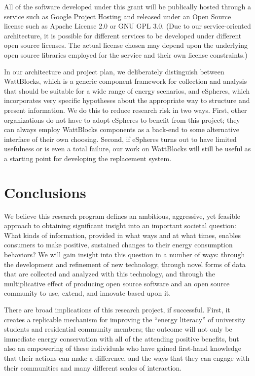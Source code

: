 All of the software developed under this grant will be publically hosted
through a service such as Google Project Hosting and released under an Open
Source license such as Apache License 2.0 or GNU GPL 3.0.  (Due to our
service-oriented architecture, it is possible for different services to be
developed under different open source licenses.  The actual license chosen
may depend upon the underlying open source libraries employed for the
service and their own license constraints.)

In our architecture and project plan, we deliberately distinguish between
WattBlocks, which is a generic component framework for collection and
analysis that should be suitable for a wide range of energy scenarios, and
eSpheres, which incorporates very specific hypotheses about the appropriate
way to structure and present information.  We do this to reduce research
risk in two ways. First, other organizations do not have to adopt eSpheres
to benefit from this project; they can always employ WattBlocks components
as a back-end to some alternative interface of their own choosing.  Second,
if eSpheres turns out to have limited usefulness or is even a total
failure, our work on WattBlocks will still be useful as a starting point
for developing the replacement system.

\section{Conclusions}
\label{sec:merit}

We believe this research program defines an ambitious, aggressive, yet
feasible approach to obtaining significant insight into an important
societal question: What kinds of information, provided in what ways and at
what times, enables consumers to make positive, sustained changes to their
energy consumption behaviors?  We will gain insight into this question in a
number of ways: through the development and refinement of new technology,
through novel forms of data that are collected and analyzed with this
technology, and through the multiplicative effect of producing open source
software and an open source community to use, extend, and innovate based
upon it.

There are broad implications of this research project, if successful.
First, it creates a replicable mechanism for improving the ``energy
literacy'' of university students and residential community members; the
outcome will not only be immediate energy conservation with all of the
attending positive benefits, but also an empowering of these individuals
who have gained first-hand knowledge that their actions can make a
difference, and the ways that they can engage with their communities and
many different scales of interaction.

